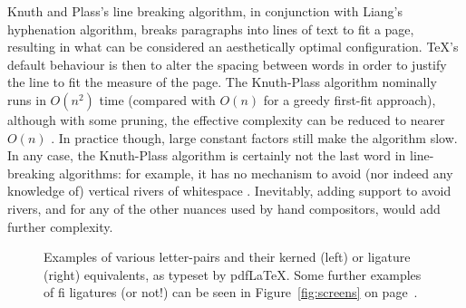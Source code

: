 Knuth and Plass's line breaking algorithm, in conjunction with Liang's hyphenation algorithm, breaks paragraphs into lines of text to fit a page, resulting in what can be considered an aesthetically optimal configuration. \TeX 's default behaviour is then to alter the spacing between words in order to justify the line to fit the measure of the page. The Knuth-Plass algorithm nominally runs in $O(n^2)$ time (compared with $O(n)$ for a greedy first-fit approach), although with some pruning, the effective complexity can be reduced to nearer $O(n)$ \cite{Hirschberg1987,Eppstein1992,Hurst2009}. In practice though, large constant factors still make the algorithm slow. In any case, the Knuth-Plass algorithm is certainly not the last word in line-breaking algorithms: for example, it has no mechanism to avoid (nor indeed any knowledge of) vertical rivers of whitespace \cite{Mittelbach1992}. Inevitably, adding support to avoid rivers, and for any of the other nuances used by hand compositors, would add further complexity.



\begin{figure}
 \caption[Examples of microtypographical techniques]{Examples of various letter-pairs and their kerned (left) or ligature (right) equivalents, as typeset by pdf\LaTeX{}. Some further examples of fi ligatures (or not!) can be seen in Figure~\ref{fig:screens} on page~\pageref{fig:screens}.}
 \label{fig:kern-lig}
\end{figure}


